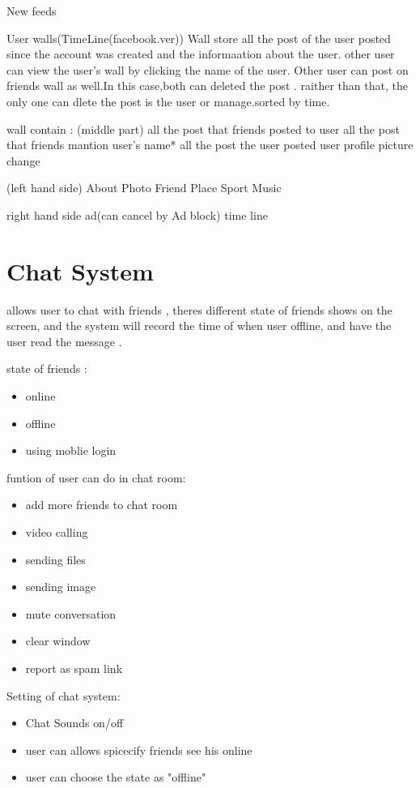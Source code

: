 New feeds

User walls(TimeLine(facebook.ver))
Wall store all the post of the user posted since the account was created and the informaation about the user. other user can view the user's wall by clicking the name of the user. Other user can post on friends wall as well.In this case,both can deleted the post . raither than that, the only one can dlete the post is the user or manage.sorted by time.

wall contain :
(middle part)
all the post that friends posted to user
all the post that friends mantion user's name*
all the post the user posted
user profile picture change

(left hand side)
About
Photo
Friend
Place
Sport
Music

right hand side
ad(can cancel by Ad block)
time line

\section{Chat System}
allows user to chat with friends , theres different state of friends shows on
the screen, and the system will record the time of when user offline, and have
the user read the message .

state of friends :
\begin{itemize}
\item online 
\item offline 
\item using moblie login
\end{itemize}

funtion of user can do in chat room:
\begin{itemize}
\item add more friends to chat room
\item video calling
\item sending files
\item sending image
\item mute conversation 
\item clear window
\item report as spam link
\end{itemize}

Setting of chat system:
\begin{itemize}
\item Chat Sounds {on/off}
\item user can allows spicecify friends see his online
\item user can choose the state as "offline"
\end{itemize}
